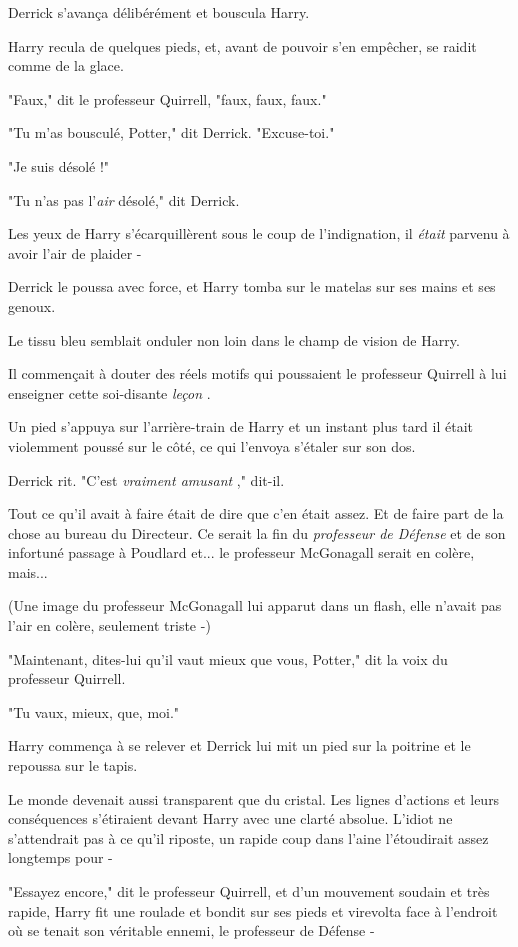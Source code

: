 Derrick s'avança délibérément et bouscula Harry.

Harry recula de quelques pieds, et, avant de pouvoir s'en empêcher, se raidit comme de la glace.

"Faux," dit le professeur Quirrell, "faux, faux, faux."

"Tu m'as bousculé, Potter," dit Derrick. "Excuse-toi."

"Je suis désolé !"

"Tu n'as pas l'\emph{air}  désolé," dit Derrick.

Les yeux de Harry s'écarquillèrent sous le coup de l'indignation, il \emph{était}  parvenu à avoir l'air de plaider -

Derrick le poussa avec force, et Harry tomba sur le matelas sur ses mains et ses genoux.

Le tissu bleu semblait onduler non loin dans le champ de vision de Harry.

Il commençait à douter des réels motifs qui poussaient le professeur Quirrell à lui enseigner cette soi-disante \emph{leçon} .

Un pied s'appuya sur l'arrière-train de Harry et un instant plus tard il était violemment poussé sur le côté, ce qui l'envoya s'étaler sur son dos.

Derrick rit. "C'est \emph{vraiment amusant} ," dit-il.

Tout ce qu'il avait à faire était de dire que c'en était assez. Et de faire part de la chose au bureau du Directeur. Ce serait la fin du \emph{professeur de Défense}  et de son infortuné passage à Poudlard et... le professeur McGonagall serait en colère, mais...

(Une image du professeur McGonagall lui apparut dans un flash, elle n'avait pas l'air en colère, seulement triste -)

"Maintenant, dites-lui qu'il vaut mieux que vous, Potter," dit la voix du professeur Quirrell.

"Tu vaux, mieux, que, moi."

Harry commença à se relever et Derrick lui mit un pied sur la poitrine et le repoussa sur le tapis.

Le monde devenait aussi transparent que du cristal. Les lignes d'actions et leurs conséquences s'étiraient devant Harry avec une clarté absolue. L'idiot ne s'attendrait pas à ce qu'il riposte, un rapide coup dans l'aine l'étoudirait assez longtemps pour -

"Essayez encore," dit le professeur Quirrell, et d'un mouvement soudain et très rapide, Harry fit une roulade et bondit sur ses pieds et virevolta face à l'endroit où se tenait son véritable ennemi, le professeur de Défense -

